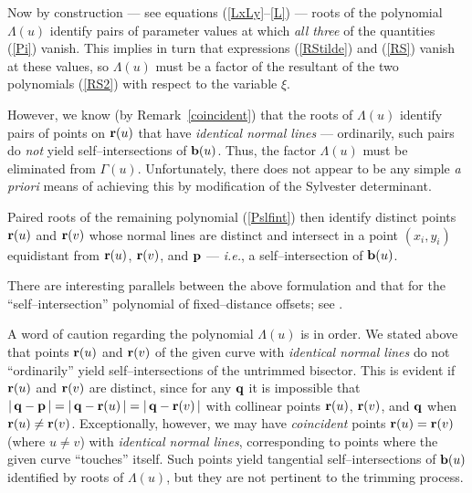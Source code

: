 Now by construction --- see equations (\ref{LxLy}--\ref{L}) --- roots
of the polynomial $\Lambda(u)$ identify pairs of parameter values at
which {\it all three\/} of the quantities (\ref{Pi}) vanish. This
implies in turn that expressions (\ref{RStilde}) and (\ref{RS}) vanish
at these values, so $\Lambda(u)$ must be a factor of the resultant
of the two polynomials (\ref{RS2}) with respect to the variable $\xi$.

However, we know (by Remark~\ref{coincident}) that the roots of
$\Lambda(u)$ identify pairs of points on ${\bf r}(u)$ that have {\it
identical normal lines\/} --- ordinarily, such pairs do {\it not\/}
yield self--intersections of ${\bf b}(u)$. Thus, the factor $\Lambda(u)$
must be eliminated from $\Gamma(u)$. Unfortunately, there does not appear
to be any simple {\it a priori\/} means of achieving this by modification
of the Sylvester determinant.

Paired roots of the remaining polynomial (\ref{Pslfint}) then identify
distinct points ${\bf r}(u)$ and ${\bf r}(v)$ whose normal lines are
distinct and intersect in a point $(x_i,y_i)$ equidistant from ${\bf r}
(u)$, ${\bf r}(v)$, and ${\bf p}$ --- {\it i.e.}, a self--intersection
of ${\bf b}(u)$. \QED

There are interesting parallels between the above formulation and
that for the ``self--intersection'' polynomial of fixed--distance
offsets; see \cite{farouki90}.

\begin{rmk}
{\rm
A word of caution regarding the polynomial $\Lambda(u)$ is in order.
We stated above that points ${\bf r}(u)$ and ${\bf r}(v)$ of the
given curve with {\it identical normal lines\/} do not ``ordinarily''
yield self--intersections of the untrimmed bisector. This is evident
if ${\bf r}(u)$ and ${\bf r}(v)$ are distinct, since for any ${\bf q}$
it is impossible that $|\,{\bf q}-{\bf p}\,|=|\,{\bf q}-{\bf r}(u)\,|=
|\,{\bf q}-{\bf r}(v)\,|$ with collinear points ${\bf r}(u)$, ${\bf r}
(v)$, and ${\bf q}$ when ${\bf r}(u)\not={\bf r}(v)$. Exceptionally,
however, we may have {\it coincident\/} points ${\bf r}(u)={\bf r}(v)$
(where $u\not=v$) with {\it identical normal lines}, corresponding to
points where the given curve ``touches'' itself. Such points yield
tangential self--intersections of ${\bf b}(u)$ identified by roots
of $\Lambda(u)$, but they are not pertinent to the trimming process.
}
\end{rmk}

